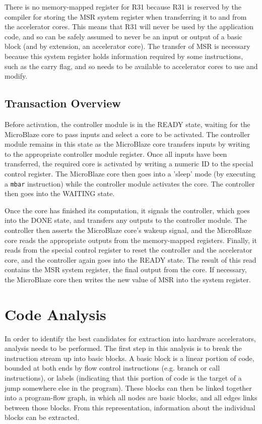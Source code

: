 \documentclass{UoYCSproject}
\begin{document}
There is no memory-mapped register for R31 because R31 is reserved by the compiler for storing the MSR system register when
transferring it to and from the accelerator cores. This means that R31 will never be used by the application code, and so
can be safely assumed to never be an input or output of a basic block (and by extension, an accelerator core). The transfer
of MSR is necessary because this system register holds information required by some instructions, such as the carry flag,
and so needs to be available to accelerator cores to use and modify.

\subsection{Transaction Overview}

Before activation, the controller module is in the READY state, waiting for the MicroBlaze core to pass inputs and select
a core to be activated. The controller module remains in this state as the MicroBlaze core transfers inputs by writing to
the appropriate controller module register. Once all inputs have been transferred, the required core is activated by writing
a numeric ID to the special control register. The MicroBlaze core then goes into a 'sleep' mode (by executing a \texttt{mbar}
instruction) while the controller module activates the core. The controller then goes into the WAITING state.

Once the core has finished its computation, it signals the controller, which goes into the DONE state, and transfers any outputs
to the controller module. The controller then asserts the MicroBlaze core's wakeup signal, and the MicroBlaze core reads
the appropriate outputs from the memory-mapped registers. Finally, it reads from the special control register to reset the
controller and the accelerator core, and the controller again goes into the READY state. The result of this read contains
the MSR system register, the final output from the core. If necessary, the MicroBlaze core then writes the new value of MSR into
the system register.

\section{Code Analysis}

In order to identify the best candidates for extraction into hardware accelerators, analysis needs to be performed.
The first step in this analysis is to break the instruction stream up into basic blocks. A basic block is a linear portion of
code, bounded at both ends by flow control instructions (e.g. branch or call instructions), or labels (indicating that this
portion of code is the target of a jump somewhere else in the program). These blocks can then be linked
together into a program-flow graph, in which all nodes are basic blocks, and all edges links between those blocks.
From this representation, information about the individual blocks can be extracted.
\end{document}
